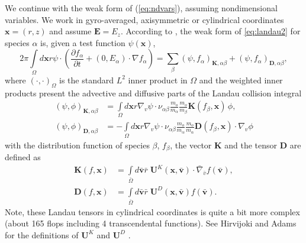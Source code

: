 \documentclass[12pt]{siamart}
\begin{document}
We continue with the weak form of (\ref{eq:ndvars}), assuming nondimensional variables.
We work in gyro-averaged, axisymmetric or cylindrical coordinates $\bm{x} = \left ( r, z \right )$ and assume ${\bm E = E_{z}}$.
According to \cite{Hirvijoki2016,AdamsHirvijokiKnepleyBrownIsaacMills2017}, the weak form of \ref{eq:landau2} for species $\alpha$ is, given a test function $\psi(\bm{x})$,  
\begin{equation}
\label{eq:weak-form}
2\pi \int \limits_{\Omega} d\bm{x} r \psi \cdot \left ( \frac{\partial  f_{\alpha}}{\partial t}  + \left ( 0, E_{\alpha} \right)  \cdot \nabla f_{\alpha}  \right)  = \sum_{\beta}\left(\psi, f_{\alpha}\right)_{\bm{K},\alpha\beta}+\left(\psi,f_{\alpha}\right)_{\mathbf{D},\alpha\beta},
\end{equation}
where $(\cdot,\cdot)_{\Omega}$ is the standard $L^2$ inner product in $\Omega$ and the weighted inner products present the advective and diffusive parts of the Landau collision integral
\begin{align}
\label{eq:K}
\left(\psi, \phi\right)_{\bm{K},\alpha\beta}&=\int \limits_{\Omega}d\bm{x}r\nabla_{v}\psi\cdot {\nu}_{\alpha\beta}\frac{m_o}{m_{\alpha}} \frac{m_o}{m_{\beta}}\bm{K}(f_{\beta},\bm{x})\, \phi,\\
\label{eq:D}
\left(\psi,\phi\right)_{\mathbf{D},\alpha\beta}&=-\int \limits_{\Omega}d\bm{x}r\nabla_{v}\psi\cdot{\nu}_{\alpha\beta}\frac{m_o}{m_{\alpha}}\frac{m_o}{m_{\alpha}}\mathbf{D}(f_{\beta},\bm{x})\cdot\nabla_{v}\phi
\end{align}
with the distribution function of species $\beta$, $f_{\beta}$, the vector $\bm{K}$ and the tensor $\mathbf{D}$ are defined as
\begin{align}
\label{eq:fric_coef}
  \bm{K}(f,\bm{x})&=\int \limits_{\bar\Omega}d\bm{\bar{v}}\bar r\;\mathbf{U}^K(\bm{x},\bm{\bar{v}})\cdot\bar{\nabla}_{\bar{v}}f(\bm{\bar{v}}), \\
\label{eq:diff_coef}
  \mathbf{D}(f,\bm{x})&=\int
  \limits_{\bar\Omega}d\bm{\bar{v}}\bar r\;\mathbf{U}^D(\bm{x},\bm{\bar{v}})f(\bm{\bar{v}}).
\end{align}
Note, these Landau tensors in cylindrical coordinates is quite a bit more complex (about 165 flops including 4 transcendental functions).
See Hirvijoki and Adams for the definitions of $\mathbf{U}^K$ and $\mathbf{U}^D$ \cite{Hirvijoki2016}.
\end{document}
